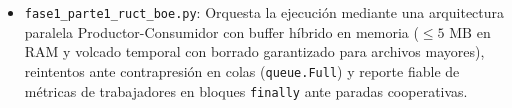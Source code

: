 \begin{itemize}
\begin{enumerate}
        \item \textbf{Fusión Multi-BOE con Cuota por Curso y Saneamiento Universal:} Acumulación histórica con tope de $60\text{ ECTS}$ por curso, descarte de planes pre-Bolonia (anteriores a 2009), modelado específico de Doctorados (RD 99/2011) y limpieza sistemática (\texttt{unreverse\_text} y saneamiento de espacios).
    \end{enumerate}
    \item \texttt{fase1\_parte1\_ruct\_boe.py}: Orquesta la ejecución mediante una arquitectura paralela Productor-Consumidor con buffer híbrido en memoria ($\le 5\text{ MB}$ en RAM y volcado temporal con borrado garantizado para archivos mayores), reintentos ante contrapresión en colas (\texttt{queue.Full}) y reporte fiable de métricas de trabajadores en bloques \texttt{finally} ante paradas cooperativas.
\end{itemize}



